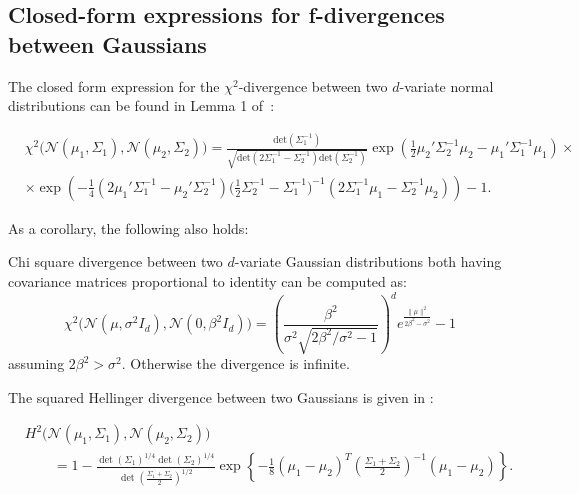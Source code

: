 \subsection{Closed-form expressions for f-divergences between Gaussians}


The closed form expression for the $\chi^2$-divergence between two $d$-variate normal distributions can be found in Lemma 1 of~\cite{NielsenN14}:
\begin{lemma}\label{lemma:chi-squared-closed-form}
\begin{align*}
&\chi^2\bigl( \mathcal{N}(\mu_1, \Sigma_1), 
\mathcal{N}(\mu_2, \Sigma_2)\bigr)
=
\frac{\mathrm{det}(\Sigma_1^{-1})}{\sqrt{\mathrm{det}(2\Sigma_1^{-1} - \Sigma_2^{-1})\mathrm{det}(\Sigma_2^{-1})}}
\exp\left(
\frac12\mu_2'\Sigma_2^{-1}\mu_2 
-\mu_1'\Sigma_1^{-1}\mu_1 
\right)
\times\\
&\times\exp\left(
-\frac14(2\mu_1' \Sigma_1^{-1} - \mu_2' \Sigma_2^{-1})
\bigl(\frac12 \Sigma_2^{-1} - \Sigma_1^{-1}\bigr)^{-1}
(2\Sigma_1^{-1}\mu_1 - \Sigma_2^{-1}\mu_2)
\right) - 1.
\end{align*}


\end{lemma}
As a corollary, the following also holds:
\begin{corollary}
Chi square divergence between two $d$-variate Gaussian distributions both having covariance matrices proportional to identity can be computed as:
\[
\chi^2\bigl( \mathcal{N}(\mu, \sigma^2 I_d), \mathcal{N}(0, \beta^2 I_d)\bigr)
=
\left(\frac{\beta^2}{\sigma^2\sqrt{2\beta^2/\sigma^2 - 1}}\right)^d
e^{\frac{\|\mu\|^2}{2\beta^2 - \sigma^2}}
- 1
\]
assuming $2\beta^{2} > \sigma^{2}$. 
Otherwise the divergence is infinite.
\end{corollary}

The squared Hellinger divergence between two Gaussians is given in \cite{pardo2005statistical}:

\begin{lemma}
\begin{align*}
&H^2\bigl( \mathcal{N}(\mu_1, \Sigma_1), 
\mathcal{N}(\mu_2, \Sigma_2)\bigr) \\
&\qquad = 1 - \frac{ \det (\Sigma_1)^{1/4} \det (\Sigma_2) ^{1/4}} { \det \left( \frac{\Sigma_1 + \Sigma_2}{2}\right)^{1/2} }
              \exp\left\{-\frac{1}{8}(\mu_1 - \mu_2)^T 
              \left(\frac{\Sigma_1 + \Sigma_2}{2}\right)^{-1}
              (\mu_1 - \mu_2)              
              \right\}.
\end{align*}
\end{lemma}

